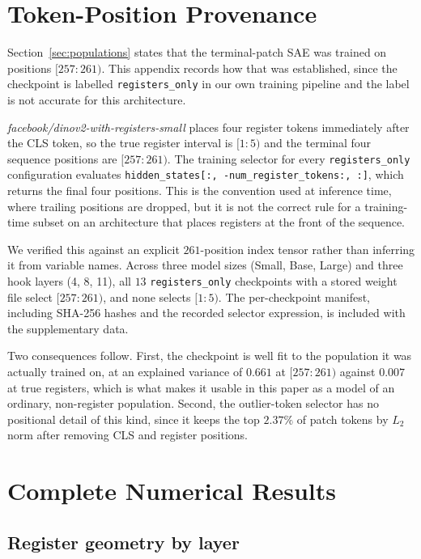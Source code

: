 \documentclass{article}
\begin{document}
\appendix
\section{Token-Position Provenance}
\label{app:provenance}

Section~\ref{sec:populations} states that the terminal-patch SAE was trained on positions $[257{:}261)$. This appendix records how that was established, since the checkpoint is labelled \texttt{registers\_only} in our own training pipeline and the label is not accurate for this architecture.

\textit{facebook/dinov2-with-registers-small} places four register tokens immediately after the CLS token, so the true register interval is $[1{:}5)$ and the terminal four sequence positions are $[257{:}261)$. The training selector for every \texttt{registers\_only} configuration evaluates \texttt{hidden\_states[:,\,-num\_register\_tokens:,\,:]}, which returns the final four positions. This is the convention used at inference time, where trailing positions are dropped, but it is not the correct rule for a training-time subset on an architecture that places registers at the front of the sequence.

We verified this against an explicit $261$-position index tensor rather than inferring it from variable names. Across three model sizes (Small, Base, Large) and three hook layers (4, 8, 11), all $13$ \texttt{registers\_only} checkpoints with a stored weight file select $[257{:}261)$, and none selects $[1{:}5)$. The per-checkpoint manifest, including SHA-256 hashes and the recorded selector expression, is included with the supplementary data.

Two consequences follow. First, the checkpoint is well fit to the population it was actually trained on, at an explained variance of $0.661$ at $[257{:}261)$ against $0.007$ at true registers, which is what makes it usable in this paper as a model of an ordinary, non-register population. Second, the outlier-token selector has no positional detail of this kind, since it keeps the top $2.37\%$ of patch tokens by $L_2$ norm after removing CLS and register positions.

\section{Complete Numerical Results}
\label{app:numbers}

\subsection{Register geometry by layer}
\end{document}
